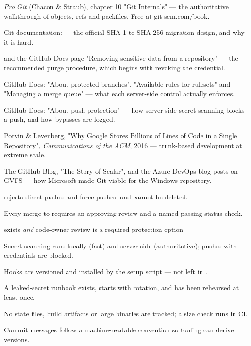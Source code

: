 \begin{wbitem}
  \item \emph{Pro Git} (Chacon \& Straub), chapter 10 "Git Internals" --- the authoritative walkthrough of objects, refs and packfiles. Free at git-scm.com/book.
  \item Git documentation:  --- the official SHA-1 to SHA-256 migration design, and why it is hard.
  \item {} and the GitHub Docs page "Removing sensitive data from a repository" --- the recommended purge procedure, which begins with revoking the credential.
  \item GitHub Docs: "About protected branches", "Available rules for rulesets" and "Managing a merge queue" --- what each server-side control actually enforces.
  \item GitHub Docs: "About push protection" --- how server-side secret scanning blocks a push, and how bypasses are logged.
  \item Potvin \& Levenberg, "Why Google Stores Billions of Lines of Code in a Single Repository", \emph{Communications of the ACM}, 2016 --- trunk-based development at extreme scale.
  \item The GitHub Blog, "The Story of Scalar", and the Azure DevOps blog posts on GVFS --- how Microsoft made Git viable for the Windows repository.
\end{wbitem}

\begin{checklist}
  \item {} rejects direct pushes and force-pushes, and cannot be deleted.
  \item Every merge to  requires an approving review and a named passing status check.
  \item {} exists \emph{and} code-owner review is a required protection option.
  \item Secret scanning runs locally (fast) and server-side (authoritative); pushes with credentials are blocked.
  \item Hooks are versioned and installed by the setup script --- not left in .
  \item A leaked-secret runbook exists, starts with rotation, and has been rehearsed at least once.
  \item No state files, build artifacts or large binaries are tracked; a size check runs in CI.
  \item Commit messages follow a machine-readable convention so tooling can derive versions.
\end{checklist}

